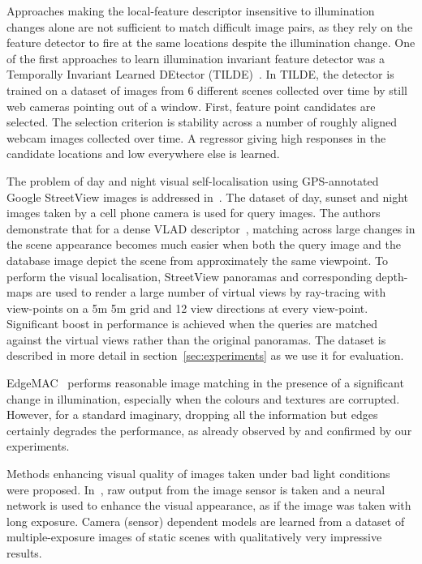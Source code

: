 Approaches making the local-feature descriptor insensitive to illumination changes alone are not sufficient to match difficult image pairs, as they rely on the feature detector to fire at the same locations despite the illumination change. One of the first approaches to learn illumination invariant feature detector was a Temporally Invariant Learned DEtector (TILDE)~\cite{Verdie-CVPR15}. In TILDE, the detector is trained on a dataset of images from 6 different scenes collected over time by still web cameras pointing out of a window. First, feature point candidates are selected. The selection criterion is stability across a number of roughly aligned webcam images collected over time. A regressor giving high responses in the candidate locations and low everywhere else is learned. 

The problem of day and night visual self-localisation using GPS-annotated Google StreetView images is addressed in~\cite{Torii-CVPR2015}.
The \Tokyo dataset of day, sunset and night images taken by a cell phone camera is used for query images. The authors demonstrate that for a dense VLAD descriptor~\cite{Jegou-CVPR10}, matching across large changes in the scene appearance becomes much easier when both the query image and the database image depict the scene from approximately the same viewpoint. To perform the visual localisation, StreetView panoramas and corresponding depth-maps are used to render a large number of virtual views by ray-tracing with view-points on a 5m  5m grid and 12 view directions at every view-point. Significant boost in performance is achieved when the queries are matched against the virtual views rather than the original panoramas.
The \Tokyo dataset is described in more detail in section~\ref{sec:experiments} as we use it for evaluation.

EdgeMAC~\cite{Radenovic-ECCV18} performs reasonable image matching in the presence of a significant change in illumination, especially when the colours and textures are corrupted. However, for a standard imaginary, dropping all the information but edges certainly degrades the performance, as already observed by \cite{Radenovic-ECCV18} and confirmed by our experiments.

Methods enhancing visual quality of images taken under bad light conditions were proposed. In~\cite{Chen-CVPR18}, raw output from the image sensor is taken and a neural network is used to enhance the visual appearance, as if the image was taken with long exposure. Camera (sensor) dependent models are learned from a dataset of multiple-exposure images of static scenes with qualitatively very impressive results.


